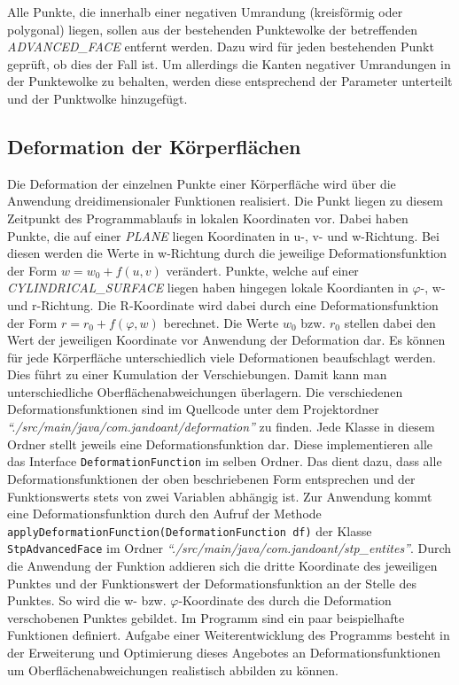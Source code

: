 Alle Punkte, die innerhalb einer negativen Umrandung (kreisförmig oder polygonal) liegen, sollen aus der bestehenden Punktewolke der betreffenden \textit{ADVANCED\_FACE} entfernt werden. Dazu wird für jeden bestehenden Punkt geprüft, ob dies der Fall ist. Um allerdings die Kanten negativer Umrandungen in der Punktewolke zu behalten, werden diese entsprechend der Parameter unterteilt und der Punktwolke hinzugefügt.

\subsection{Deformation der Körperflächen}

Die Deformation der einzelnen Punkte einer Körperfläche wird über die Anwendung dreidimensionaler Funktionen realisiert. Die Punkt liegen zu diesem Zeitpunkt des Programmablaufs in lokalen Koordinaten vor. Dabei haben Punkte, die auf einer \textit{PLANE} liegen Koordinaten in u-, v- und w-Richtung. Bei diesen werden die Werte in w-Richtung durch die jeweilige Deformationsfunktion der Form $w = w_0 + f(u,v)$ verändert. Punkte, welche auf einer \textit{CYLINDRICAL\_SURFACE} liegen haben hingegen lokale Koordianten in $\varphi$-, w- und r-Richtung. Die R-Koordinate wird dabei durch eine Deformationsfunktion der Form $r=r_0+f(\varphi, w)$ berechnet. Die Werte $w_0$ bzw. $r_0$ stellen dabei den Wert der jeweiligen Koordinate vor Anwendung der Deformation dar.
Es können für jede Körperfläche unterschiedlich viele Deformationen beaufschlagt werden. Dies führt zu einer Kumulation der Verschiebungen. Damit kann man unterschiedliche Oberflächenabweichungen überlagern.
Die verschiedenen Deformationsfunktionen sind im Quellcode unter dem Projektordner \textit{"`./src/\-main/\-java/\-com.jandoant/deformation"'} zu finden. Jede Klasse in diesem Ordner stellt jeweils eine Deformationsfunktion dar. Diese implementieren alle das Interface \verb|DeformationFunction| im selben Ordner. Das dient dazu, dass alle Deformationsfunktionen der oben beschriebenen Form entsprechen und der Funktionswerts stets von zwei Variablen abhängig ist. Zur Anwendung kommt eine Deformationsfunktion durch den Aufruf der Methode \verb|applyDeformationFunction(DeformationFunction df)| der Klasse \verb|StpAdvancedFace| im Ordner \textit{"`./src/\-main/\-java/\-com.jandoant/stp\_entites"'}. Durch die Anwendung der Funktion addieren sich die dritte Koordinate des jeweiligen Punktes und der Funktionswert der Deformationsfunktion an der Stelle des Punktes. So wird die w- bzw. $\varphi$-Koordinate des durch die Deformation verschobenen Punktes gebildet. Im Programm sind ein paar beispielhafte Funktionen definiert. Aufgabe einer Weiterentwicklung des Programms besteht in der Erweiterung und Optimierung dieses Angebotes an Deformationsfunktionen um Oberflächenabweichungen realistisch abbilden zu können.

